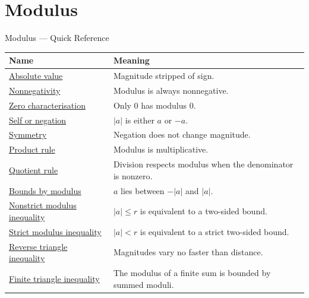 \section{Modulus}

\begin{toolkitbox}{Modulus --- Quick Reference}
\small
\begin{tabular}{l l}
\toprule
\textbf{Name} & \textbf{Meaning}\\
\midrule
\hyperref[def:absolute-value]{Absolute value} & Magnitude stripped of sign.\\
\hyperref[thm:absolute-value-nonneg]{Nonnegativity} & Modulus is always nonnegative.\\
\hyperref[thm:absolute-value-zero-iff-zero]{Zero characterisation} & Only $0$ has modulus $0$.\\
\hyperref[thm:absolute-value-self-or-neg]{Self or negation} & $|a|$ is either $a$ or $-a$.\\
\hyperref[thm:absolute-value-symmetric]{Symmetry} & Negation does not change magnitude.\\
\hyperref[thm:absolute-value-product]{Product rule} & Modulus is multiplicative.\\
\hyperref[thm:absolute-value-quotient]{Quotient rule} & Division respects modulus when the denominator is nonzero.\\
\hyperref[thm:absolute-value-bounds]{Bounds by modulus} & $a$ lies between $-|a|$ and $|a|$.\\
\hyperref[thm:absolute-value-le-iff]{Nonstrict modulus inequality} & $|a|\le r$ is equivalent to a two-sided bound.\\
\hyperref[thm:absolute-value-lt-iff]{Strict modulus inequality} & $|a|<r$ is equivalent to a strict two-sided bound.\\
\hyperref[thm:reverse-triangle-inequality]{Reverse triangle inequality} & Magnitudes vary no faster than distance.\\
\hyperref[thm:absolute-value-sum-bound]{Finite triangle inequality} & The modulus of a finite sum is bounded by summed moduli.\\
\bottomrule
\end{tabular}
\end{toolkitbox}


